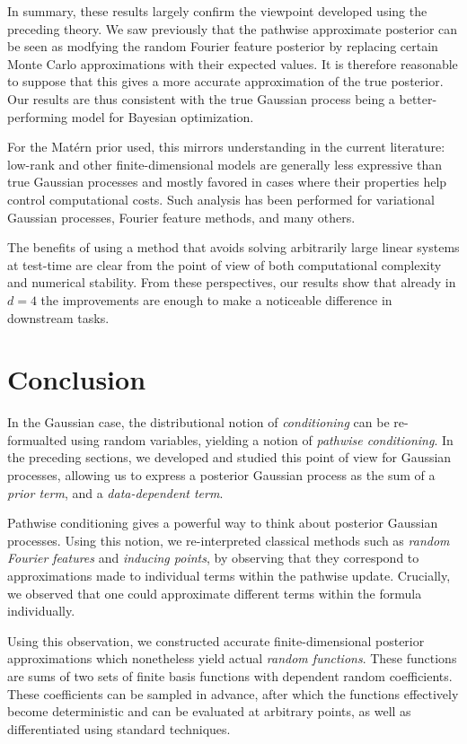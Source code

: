 \documentclass[11pt]{book}
\begin{document}
In summary, these results largely confirm the viewpoint developed using the preceding theory.
We saw previously that the pathwise approximate posterior can be seen as modfying the random Fourier feature posterior by replacing certain Monte Carlo approximations with their expected values.
It is therefore reasonable to suppose that this gives a more accurate approximation of the true posterior.
Our results are thus consistent with the true Gaussian process being a better-performing model for Bayesian optimization.

For the Matérn prior used, this mirrors understanding in the current literature: low-rank and other finite-dimensional models are generally less expressive than true Gaussian processes and mostly favored in cases where their properties help control computational costs.
Such analysis has been performed for variational Gaussian processes, Fourier feature methods, and many others.

The benefits of using a method that avoids solving arbitrarily large linear systems at test-time are clear from the point of view of both computational complexity and numerical stability.
From these perspectives, our results show that already in $d=4$ the improvements are enough to make a noticeable difference in downstream tasks.


\section{Conclusion}

In the Gaussian case, the distributional notion of \emph{conditioning} can be re-formualted using random variables, yielding a notion of \emph{pathwise conditioning}.
In the preceding sections, we developed and studied this point of view for Gaussian processes, allowing us to express a posterior Gaussian process as the sum of a \emph{prior term}, and a \emph{data-dependent term}.

Pathwise conditioning gives a powerful way to think about posterior Gaussian processes.
Using this notion, we re-interpreted classical methods such as \emph{random Fourier features} and \emph{inducing points}, by observing that they correspond to approximations made to individual terms within the pathwise update.
Crucially, we observed that one could approximate different terms within the formula individually.

Using this observation, we constructed accurate finite-dimensional posterior approximations which nonetheless yield actual \emph{random functions}.
These functions are sums of two sets of finite basis functions with dependent random coefficients.
These coefficients can be sampled in advance, after which the functions effectively become deterministic and can be evaluated at arbitrary points, as well as differentiated using standard techniques.
\end{document}

